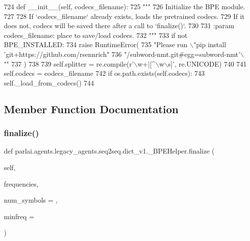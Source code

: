 \begin{DoxyCode}
724     \textcolor{keyword}{def }\_\_init\_\_(self, codecs\_filename):
725         \textcolor{stringliteral}{"""}
726 \textcolor{stringliteral}{        Initialize the BPE module.}
727 \textcolor{stringliteral}{}
728 \textcolor{stringliteral}{        If `codecs\_filename` already exists, loads the pretrained codecs.}
729 \textcolor{stringliteral}{        If it does not, codecs will be saved there after a call to `finalize()`.}
730 \textcolor{stringliteral}{}
731 \textcolor{stringliteral}{        :param codecs\_filename: place to save/load codecs.}
732 \textcolor{stringliteral}{        """}
733         \textcolor{keywordflow}{if} \textcolor{keywordflow}{not} BPE\_INSTALLED:
734             \textcolor{keywordflow}{raise} RuntimeError(
735                 \textcolor{stringliteral}{"Please run \(\backslash\)"pip install 'git+https://github.com/rsennrich"}
736                 \textcolor{stringliteral}{"/subword-nmt.git#egg=subword-nmt'\(\backslash\)""}
737             )
738 
739         self.splitter = re.compile(\textcolor{stringliteral}{r'\(\backslash\)w+|[^\(\backslash\)w\(\backslash\)s]'}, re.UNICODE)
740 
741         self.codecs = codecs\_filename
742         \textcolor{keywordflow}{if} os.path.exists(self.codecs):
743             self.\_load\_from\_codecs()
744 
\end{DoxyCode}


\subsection{Member Function Documentation}
\mbox{\label{classparlai_1_1agents_1_1legacy__agents_1_1seq2seq_1_1dict__v1_1_1__BPEHelper_a90568a5897058075adae4b066693c0cc}} 
\subsubsection{\texorpdfstring{finalize()}{finalize()}}
{\footnotesize\ttfamily def parlai.\+agents.\+legacy\+\_\+agents.\+seq2seq.\+dict\+\_\+v1.\+\_\+\+B\+P\+E\+Helper.\+finalize (\begin{DoxyParamCaption}\item[{}]{self,  }\item[{}]{frequencies,  }\item[{}]{num\+\_\+symbols = {},  }\item[{}]{minfreq = {} }\end{DoxyParamCaption})}

